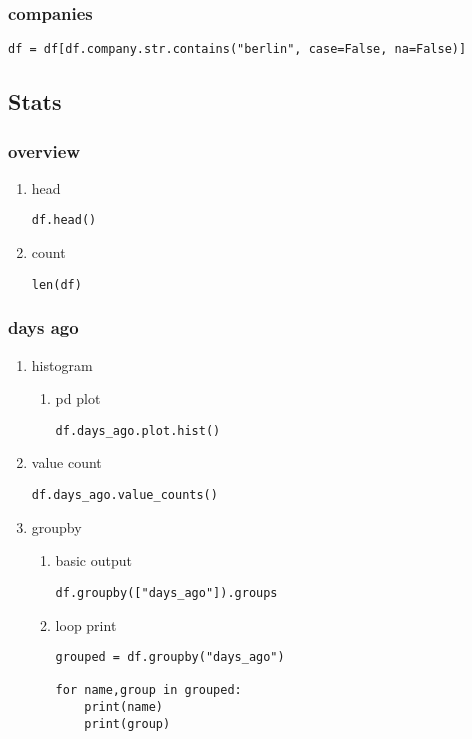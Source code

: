 \documentclass[11pt]{article}
\begin{document}
\subsubsection{companies}
\label{sec:org7878e59}
\begin{verbatim}
df = df[df.company.str.contains("berlin", case=False, na=False)]
\end{verbatim}
\subsection{Stats}
\label{sec:orgbd19f4c}
\subsubsection{overview}
\label{sec:org4700964}
\begin{enumerate}
\item head
\label{sec:org2c5e1a9}
\begin{verbatim}
df.head()
\end{verbatim}

\item count
\label{sec:orgafb7bdd}
\begin{verbatim}
len(df)
\end{verbatim}
\end{enumerate}

\subsubsection{days ago}
\label{sec:org951a2cb}
\begin{enumerate}
\item histogram
\label{sec:orgbfe398c}
\begin{enumerate}
\item pd plot
\label{sec:orgea18809}
\begin{verbatim}
df.days_ago.plot.hist()
\end{verbatim}
\end{enumerate}
\item value count
\label{sec:org0aace72}
\begin{verbatim}
df.days_ago.value_counts()
\end{verbatim}
\item groupby
\label{sec:org54017ed}
\begin{enumerate}
\item basic output
\label{sec:org2d28748}
\begin{verbatim}
df.groupby(["days_ago"]).groups
\end{verbatim}
\item loop print
\label{sec:org6e66ad8}
\begin{verbatim}
grouped = df.groupby("days_ago")

for name,group in grouped:
    print(name)
    print(group)
\end{verbatim}
\end{enumerate}
\end{enumerate}
\end{document}
